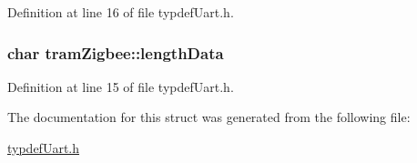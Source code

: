 Definition at line 16 of file typdef\-Uart.\-h.

\hypertarget{structtramZigbee_a688bc48e9e6da34837d4636d5e60b849}{
\subsubsection[{length\-Data}]{\setlength{\rightskip}{0pt plus 5cm}char tram\-Zigbee\-::length\-Data}}\label{structtramZigbee_a688bc48e9e6da34837d4636d5e60b849}


Definition at line 15 of file typdef\-Uart.\-h.



The documentation for this struct was generated from the following file\-:\begin{DoxyCompactItemize}
\item 
\hyperlink{typdefUart_8h}{typdef\-Uart.\-h}\end{DoxyCompactItemize}
